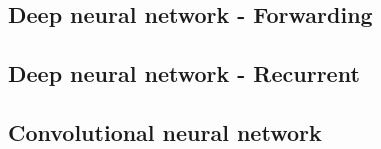 \subsection{Deep neural network - Forwarding}
\subsection{Deep neural network - Recurrent}
\subsection{Convolutional neural network}